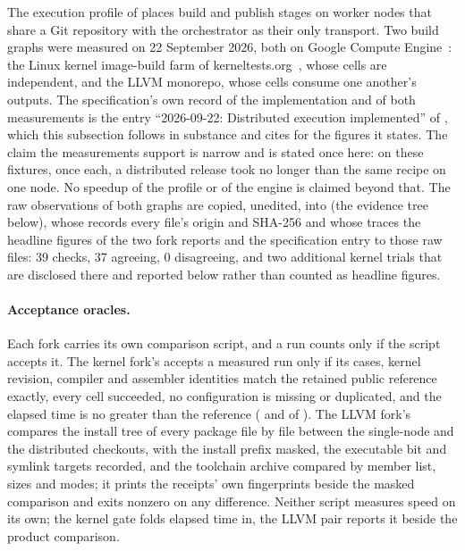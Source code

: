 The execution profile of  places build and publish stages on worker
nodes that share a Git repository with the orchestrator as their only
transport. Two build graphs were measured on 22 September 2026, both on Google
Compute Engine~\cite{gce}: the Linux kernel image-build farm of
kerneltests.org~\cite{kerneltests}, whose cells are independent, and the LLVM
monorepo, whose cells consume one another's outputs. The specification's own
record of the implementation and of both measurements is the entry
``2026-09-22: Distributed execution implemented'' of
,
which this subsection follows in substance and cites for the figures it
states. The claim the measurements support is narrow and is stated once here:
on these fixtures, once each, a distributed release took no longer than the
same recipe on one node. No speedup of the profile or of the engine is claimed
beyond that. The raw observations of both graphs are copied, unedited, into
 (the evidence tree below),
whose  records every file's origin and SHA-256 and whose
 traces the headline figures of the two fork reports
and the specification entry to those raw files: 39 checks, 37 agreeing, 0
disagreeing, and two additional kernel trials that are disclosed there and
reported below rather than counted as headline figures.

\paragraph{Acceptance oracles.}
Each fork carries its own comparison script, and a run counts only if the
script accepts it. The kernel fork's  accepts a
measured run only if its cases, kernel revision, compiler and assembler
identities match the retained public reference exactly, every cell succeeded,
no configuration is missing or duplicated, and the elapsed time is no greater
than the reference ( and  of
). The LLVM fork's
 compares the install tree of every package
file by file between the single-node and the distributed checkouts, with the
install prefix masked, the executable bit and symlink targets recorded, and
the toolchain archive compared by member list, sizes and modes; it prints the
receipts' own fingerprints beside the masked comparison and exits nonzero on
any difference. Neither script measures speed on its own; the kernel gate
folds elapsed time in, the LLVM pair reports it beside the product comparison.

